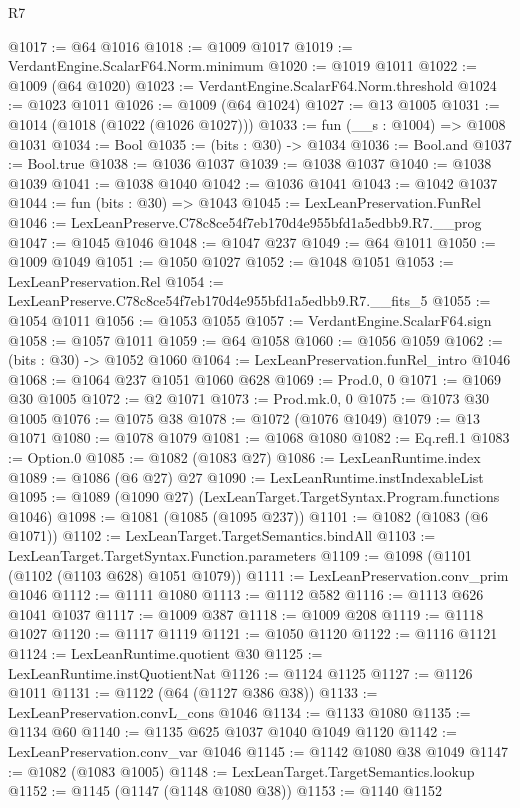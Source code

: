 \begin{lexlean}{R7}
\begin{coremodule}
@1017 := @64 @1016
@1018 := @1009 @1017
@1019 := VerdantEngine.ScalarF64.Norm.minimum
@1020 := @1019 @1011
@1022 := @1009 (@64 @1020)
@1023 := VerdantEngine.ScalarF64.Norm.threshold
@1024 := @1023 @1011
@1026 := @1009 (@64 @1024)
@1027 := @13 @1005
@1031 := @1014 (@1018 (@1022 (@1026 @1027)))
@1033 := fun (__s : @1004) => @1008 @1031
@1034 := Bool
@1035 := (bits : @30) -> @1034
@1036 := Bool.and
@1037 := Bool.true
@1038 := @1036 @1037
@1039 := @1038 @1037
@1040 := @1038 @1039
@1041 := @1038 @1040
@1042 := @1036 @1041
@1043 := @1042 @1037
@1044 := fun (bits : @30) => @1043
@1045 := LexLeanPreservation.FunRel
@1046 := LexLeanPreserve.C78c8ce54f7eb170d4e955bfd1a5edbb9.R7.__prog
@1047 := @1045 @1046
@1048 := @1047 @237
@1049 := @64 @1011
@1050 := @1009 @1049
@1051 := @1050 @1027
@1052 := @1048 @1051
@1053 := LexLeanPreservation.Rel
@1054 := LexLeanPreserve.C78c8ce54f7eb170d4e955bfd1a5edbb9.R7.__fits_5
@1055 := @1054 @1011
@1056 := @1053 @1055
@1057 := VerdantEngine.ScalarF64.sign
@1058 := @1057 @1011
@1059 := @64 @1058
@1060 := @1056 @1059
@1062 := (bits : @30) -> @1052 @1060
@1064 := LexLeanPreservation.funRel_intro @1046
@1068 := @1064 @237 @1051 @1060 @628
@1069 := Prod.{0, 0}
@1071 := @1069 @30 @1005
@1072 := @2 @1071
@1073 := Prod.mk.{0, 0}
@1075 := @1073 @30 @1005
@1076 := @1075 @38
@1078 := @1072 (@1076 @1049)
@1079 := @13 @1071
@1080 := @1078 @1079
@1081 := @1068 @1080
@1082 := Eq.refl.{1}
@1083 := Option.{0}
@1085 := @1082 (@1083 @27)
@1086 := LexLeanRuntime.index
@1089 := @1086 (@6 @27) @27
@1090 := LexLeanRuntime.instIndexableList
@1095 := @1089 (@1090 @27) (LexLeanTarget.TargetSyntax.Program.functions @1046)
@1098 := @1081 (@1085 (@1095 @237))
@1101 := @1082 (@1083 (@6 @1071))
@1102 := LexLeanTarget.TargetSemantics.bindAll
@1103 := LexLeanTarget.TargetSyntax.Function.parameters
@1109 := @1098 (@1101 (@1102 (@1103 @628) @1051 @1079))
@1111 := LexLeanPreservation.conv_prim @1046
@1112 := @1111 @1080
@1113 := @1112 @582
@1116 := @1113 @626 @1041 @1037
@1117 := @1009 @387
@1118 := @1009 @208
@1119 := @1118 @1027
@1120 := @1117 @1119
@1121 := @1050 @1120
@1122 := @1116 @1121
@1124 := LexLeanRuntime.quotient @30
@1125 := LexLeanRuntime.instQuotientNat
@1126 := @1124 @1125
@1127 := @1126 @1011
@1131 := @1122 (@64 (@1127 @386 @38))
@1133 := LexLeanPreservation.convL_cons @1046
@1134 := @1133 @1080
@1135 := @1134 @60
@1140 := @1135 @625 @1037 @1040 @1049 @1120
@1142 := LexLeanPreservation.conv_var @1046
@1145 := @1142 @1080 @38 @1049
@1147 := @1082 (@1083 @1005)
@1148 := LexLeanTarget.TargetSemantics.lookup
@1152 := @1145 (@1147 (@1148 @1080 @38))
@1153 := @1140 @1152

\end{coremodule}
\end{lexlean}
